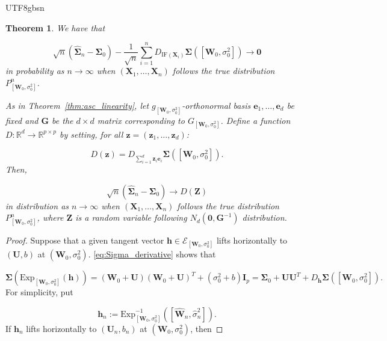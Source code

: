 \documentclass[12pt]{report}
\newcommand{\bracket}[1]{\left ( #1 \right )}
\newcommand{\squared}[1]{\left [ #1 \right ]}
\theoremstyle{plain}
\newtheorem{theorem}{Theorem}
\theoremstyle{definition}
\begin{document}
\begin{CJK*}{UTF8}{gbsn}
\begin{theorem}
We have that

\begin{equation}\label{eq:covariance_fit}
  \sqrt{n}\bracket{\hat{\bm{\Sigma}}_n - \bm{\Sigma}_0}
  - \frac{1}{\sqrt{n}}\sum_{i=1}^n D_{\text{IF}(\bm{X}_i)}\bm{\Sigma}(\squared{\bm{W}_0, \sigma_0^2}) \to \bm{0}
\end{equation}
in probability as $n \to \infty$ when 
$(\bm{X}_1, \ldots, \bm{X}_n)$
follows the true distribution $P^n_{[\bm{W}_0, \sigma_0^2]}$.

As in Theorem~\ref{thm:asc_linearity},
let $g_{[\bm{W}_0, \sigma_0^2]}$-orthonormal basis $\bm{e}_1, \ldots, \bm{e}_d$
be fixed and $\bm{G}$ be the $d \times d$ matrix corresponding to $G_{[\bm{W}_0, \sigma_0^2]}$.
Define a function $D: \mathbb{R}^d \to \mathbb{R}^{p \times p}$
by setting, for all $\bm{z} = (\bm{z}_1, \ldots, \bm{z}_d)$:

\begin{equation*}
  D(\bm{z}) = D_{\sum_{i=1}^d \bm{z}_i \bm{e}_i}\bm{\Sigma}(\squared{\bm{W}_0, \sigma_0^2}).
\end{equation*}
Then, 

\begin{equation*}
  \sqrt{n}\bracket{\hat{\bm{\Sigma}}_n - \bm{\Sigma}_0} \to D(\bm{Z})
\end{equation*}
in distribution as $n \to \infty$ 
when 
$(\bm{X}_1, \ldots, \bm{X}_n)$
follows the true distribution $P^n_{[\bm{W}_0, \sigma_0^2]}$,
where $\bm{Z}$ is a random variable following $N_d(\bm{0}, \bm{G}^{-1})$
distribution.
\end{theorem}

\begin{proof}
Suppose that a given tangent vector $\bm{h} \in \mathcal{E}_{[\bm{W}_0, \sigma_0^2]}$
lifts horizontally to $(\bm{U}, b)$ at $(\bm{W}_0, \sigma_0^2)$.
\eqref{eq:Sigma_derivative} shows that 

\begin{equation*}
  \bm{\Sigma}\bracket{\text{Exp}_{[\bm{W}_0, \sigma_0^2]}(\bm{h})}
  = (\bm{W}_0+\bm{U})(\bm{W}_0+\bm{U})^T + (\sigma_0^2+b)\bm{I}_p
  = \bm{\Sigma}_0 + \bm{U}\bm{U}^T + D_{\bm{h}} \bm{\Sigma}([\bm{W}_0, \sigma_0^2]).
\end{equation*}
For simplicity, put 

\begin{equation*}
  \bm{h}_n := \text{Exp}^{-1}_{[\bm{W}_0, \sigma_0^2]}\bracket{\squared{\hat{\bm{W}}_n,\hat{\sigma}_n^2}}.
\end{equation*}
If $\bm{h}_n$
lifts horizontally to $(\bm{U}_n, b_n)$ at $(\bm{W}_0, \sigma_0^2)$,
then 


\end{proof}
\end{CJK*}
\end{document}
